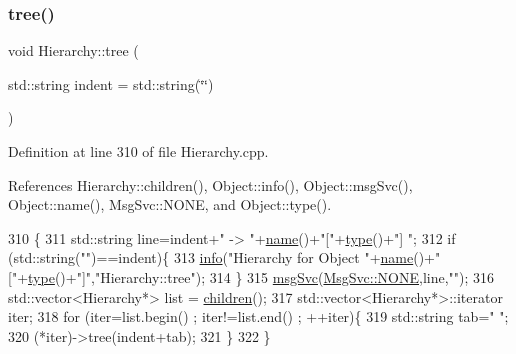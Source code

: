 \subsubsection{\texorpdfstring{tree()}{tree()}\hspace{0.1cm}{\footnotesize\ttfamily [1/2]}}
{\footnotesize\ttfamily void Hierarchy\+::tree (\begin{DoxyParamCaption}\item[{std\+::string}]{indent = {\ttfamily std\+:\+:string(\char`\"{}\char`\"{})} }\end{DoxyParamCaption})\hspace{0.3cm}{\ttfamily [inherited]}}



Definition at line 310 of file Hierarchy.\+cpp.



References Hierarchy\+::children(), Object\+::info(), Object\+::msg\+Svc(), Object\+::name(), Msg\+Svc\+::\+N\+O\+NE, and Object\+::type().


\begin{DoxyCode}
310                                     \{
311   std::string line=indent+\textcolor{stringliteral}{" -> "}+\hyperlink{classObject_a300f4c05dd468c7bb8b3c968868443c1}{name}()+\textcolor{stringliteral}{"["}+\hyperlink{classObject_a84f99f70f144a83e1582d1d0f84e4e62}{type}()+\textcolor{stringliteral}{"] "};
312   \textcolor{keywordflow}{if} (std::string(\textcolor{stringliteral}{""})==indent)\{
313     \hyperlink{classObject_a644fd329ea4cb85f54fa6846484b84a8}{info}(\textcolor{stringliteral}{"Hierarchy for Object "}+\hyperlink{classObject_a300f4c05dd468c7bb8b3c968868443c1}{name}()+\textcolor{stringliteral}{"["}+\hyperlink{classObject_a84f99f70f144a83e1582d1d0f84e4e62}{type}()+\textcolor{stringliteral}{"]"},\textcolor{stringliteral}{"Hierarchy::tree"});
314   \}
315   \hyperlink{classObject_a3f9d5537ebce0c0f2bf6ae4d92426f3c}{msgSvc}(\hyperlink{classMsgSvc_ae671eb7301996cd049d2da8a65925926a9be9ae32fed8e1e6eba4a58692210fbd}{MsgSvc::NONE},line,\textcolor{stringliteral}{""});
316   std::vector<Hierarchy*> list = \hyperlink{classHierarchy_aa9a76f69e98e052ee1a6e32cea006288}{children}();
317   std::vector<Hierarchy*>::iterator iter;
318   \textcolor{keywordflow}{for} (iter=list.begin() ; iter!=list.end() ; ++iter)\{
319     std::string tab=\textcolor{stringliteral}{"  "};
320     (*iter)->tree(indent+tab);
321   \}
322 \}
\end{DoxyCode}
\mbox{\label{classHierarchy_a594c294c5f60c230e106d522ed008212}} 
